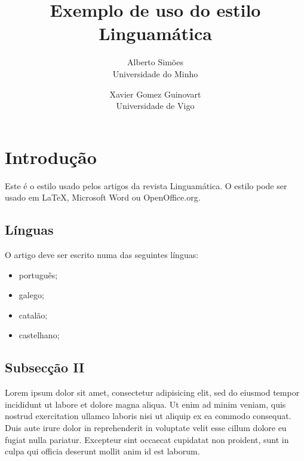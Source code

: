 \documentclass[a4paper, twocolumn, 11pt, twoside]{article}
\title{Exemplo de uso do estilo Linguamática}
\author{
  Alberto Simões\\
  Universidade do Minho\\
  \email{ambs@di.uminho.pt} 
  \and 
  Xavier Gomez Guinovart\\
  Universidade de Vigo\\
  \email{xgg@uvigo.es}
}
\date{}
\begin{document}
\thispagestyle{empty}


\section{Introdução}

Este é o estilo usado pelos artigos da revista Linguamática. O estilo
pode ser usado em \LaTeX \cite{latexcompanion}, Microsoft Word ou
OpenOffice.org.

\subsection{Línguas}

O artigo deve ser escrito numa das seguintes línguas:
\begin{itemize}
  \item português;
  \item galego;
  \item catalão;
  \item castelhano;
\end{itemize}

\subsection{Subsecção II}

Lorem ipsum dolor sit amet, consectetur adipisicing elit, sed do eiusmod
tempor incididunt ut labore et dolore magna aliqua. Ut enim ad minim
veniam, quis nostrud exercitation ullamco laboris nisi ut aliquip ex ea
commodo consequat. Duis aute irure dolor in reprehenderit in voluptate
velit esse cillum dolore eu fugiat nulla pariatur. Excepteur sint
occaecat cupidatat non proident, sunt in culpa qui officia deserunt
mollit anim id est laborum.
\end{document}
